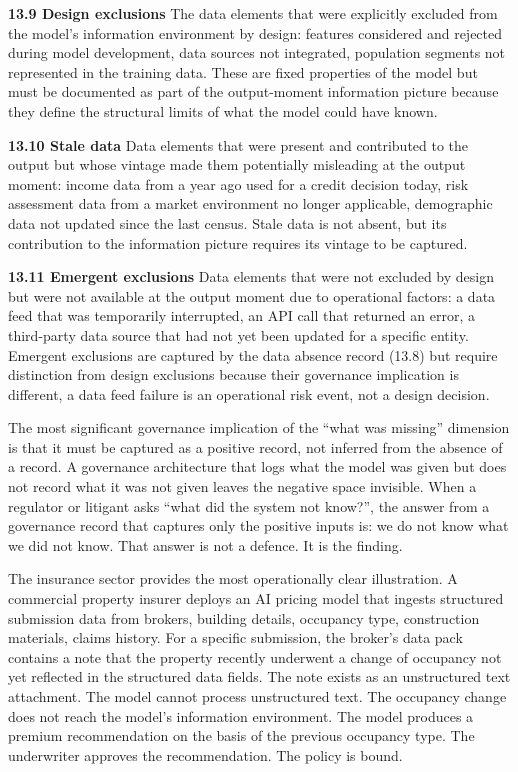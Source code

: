 \textbf{13.9 Design exclusions} The data elements that were explicitly excluded from the model's information environment by design: features considered and rejected during model development, data sources not integrated, population segments not represented in the training data. These are fixed properties of the model but must be documented as part of the output-moment information picture because they define the structural limits of what the model could have known.

\textbf{13.10 Stale data} Data elements that were present and contributed to the output but whose vintage made them potentially misleading at the output moment: income data from a year ago used for a credit decision today, risk assessment data from a market environment no longer applicable, demographic data not updated since the last census. Stale data is not absent, but its contribution to the information picture requires its vintage to be captured.

\textbf{13.11 Emergent exclusions} Data elements that were not excluded by design but were not available at the output moment due to operational factors: a data feed that was temporarily interrupted, an API call that returned an error, a third-party data source that had not yet been updated for a specific entity. Emergent exclusions are captured by the data absence record (13.8) but require distinction from design exclusions because their governance implication is different, a data feed failure is an operational risk event, not a design decision.

The most significant governance implication of the ``what was missing'' dimension is that it must be captured as a positive record, not inferred from the absence of a record. A governance architecture that logs what the model was given but does not record what it was not given leaves the negative space invisible. When a regulator or litigant asks ``what did the system not know?'', the answer from a governance record that captures only the positive inputs is: we do not know what we did not know. That answer is not a defence. It is the finding.

The insurance sector provides the most operationally clear illustration. A commercial property insurer deploys an AI pricing model that ingests structured submission data from brokers, building details, occupancy type, construction materials, claims history. For a specific submission, the broker's data pack contains a note that the property recently underwent a change of occupancy not yet reflected in the structured data fields. The note exists as an unstructured text attachment. The model cannot process unstructured text. The occupancy change does not reach the model's information environment. The model produces a premium recommendation on the basis of the previous occupancy type. The underwriter approves the recommendation. The policy is bound.

